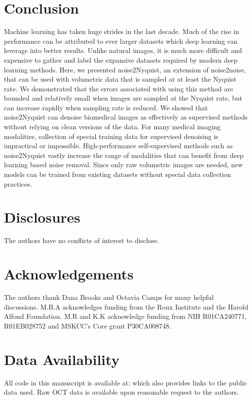 \documentclass[12pt]{spieman}
\begin{document}
\begin{spacing}{2}
\section{Conclusion}
Machine learning has taken huge strides in the last decade. Much of the rise in performance can be attributed to ever larger datasets which deep learning can leverage into better results. Unlike natural images, it is much more difficult and expensive to gather and label the expansive datasets required by modern deep learning methods. Here, we presented noise2Nyquist, an extension of noise2noise, that can be used with volumetric data that is sampled at at least the Nyquist rate. We demonstrated that the errors associated with using this method are bounded and relatively small when images are sampled at the Nyquist rate, but can increase rapidly when sampling rate is reduced. We showed that noise2Nyquist can denoise biomedical images as effectively as supervised methods without relying on clean versions of the data. For many medical imaging modalities, collection of special training data for supervised denoising is impractical or impossible. High-performance self-supervised methods such as noise2Nyquist vastly increase the range of modalities that can benefit from deep learning based noise removal. Since only raw volumetric images are needed, new models can be trained from existing datasets without special data collection practices.

\section*{Disclosures}
The authors have no conflicts of interest to disclose.

\section*{Acknowledgements}
 The authors thank Dana Brooks and Octavia Camps for many helpful discussions.  M.B.A acknowledges funding from the Roux Institute and the Harold Alfond Foundation. M.R and K.K acknowledge funding from NIH R01CA240771, R01EB028752 and MSKCC’s Core grant P30CA008748.

\section*{Data Availability}
All code in this manuscript is available at:  which also provides links to the public data used. Raw OCT data is available upon reasonable request to the authors.


\end{spacing}
\end{document}
